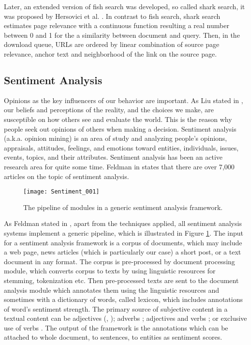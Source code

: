 	Later, an extended version of fish search was developed, so called shark search, it was proposed by Hersovici et al. \cite[p. 317-326]{H1998}. In contrast to fish search, shark search estimates page relevance with a continuous function resulting a real number between 0 and 1 for the a similarity between document and query. Then, in the download queue, URLs are ordered by linear combination of source page relevance, anchor text and neighborhood of the link on the source page.

	\subsection{Sentiment Analysis}
	
	Opinions as the key influencers of our behavior are important. As Liu stated in \cite{L2011}, our beliefs and perceptions of the reality, and the choices we make, are susceptible on how others see and evaluate the world. This is the reason why people seek out opinions of others when making a decision. Sentiment analysis (a.k.a. opinion mining) is an area of study and analyzing people's opinions, appraisals, attitudes, feelings, and emotions toward entities, individuals, issues, events, topics, and their attributes. Sentiment analysis has been an active research area for quite some time. Feldman in \cite[p. 82-89]{F2013} states that there are over 7,000 articles on the topic of sentiment analysis.
	
	\begin{figure}\centering
		\texttt{[image: Sentiment\_001]}
		\caption{The pipeline of modules in a generic sentiment analysis framework.}\label{fig:Sentiment_001}
	\end{figure}
	
	As Feldman stated in \cite{F2013}, apart from the techniques applied, all sentiment analysis systems implement a generic pipeline, which is illustrated in Figure \ref{fig:Sentiment_001}. The input for a sentiment analysis framework is a corpus of documents, which may include a web page, news articles (which is particularly our case) a short post, or a text document in any format. The corpus is pre-processed by document processing module, which converts corpus to texts by using linguistic resources for stemming, tokenization etc. Then pre-processed texts are sent to the document analysis module which annotates them using the linguistic resources and sometimes with a dictionary of words, called lexicon, which includes annotations of word's sentiment strength. The primary source of subjective content in a textual content can be adjectives (\cite{H1997}, \cite{H2004}); adverbs \cite{B2007} ; adjectives and verbs \cite{K2004}; or exclusive use of verbs \cite{S2008}. The output of the framework is the annotations which can be attached to whole document, to sentences, to entities as sentiment scores.
	
